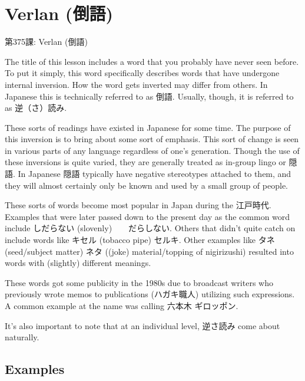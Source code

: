     
\chapter{Verlan (倒語)}

\begin{center}
\begin{Large}
第375課: Verlan (倒語) 
\end{Large}
\end{center}
 
\par{ The title of this lesson includes a word that you probably have never seen before. To put it simply, this word specifically describes words that have undergone internal inversion. How the word gets inverted may differ from others. In Japanese this is technically referred to as 倒語. Usually, though, it is referred to as 逆（さ）読み. }

\par{ These sorts of readings have existed in Japanese for some time. The purpose of this inversion is to bring about some sort of emphasis. This sort of change is seen in various parts of any language regardless of one's generation. Though the use of these inversions is quite varied, they are generally treated as in-group lingo or 隠語. In Japanese 隠語 typically have negative stereotypes attached to them, and they will almost certainly only be known and used by a small group of people. }

\par{ These sorts of words become most popular in Japan during the 江戸時代. Examples that were later passed down to the present day as the common word include しだらない (slovenly)　\textrightarrow 　だらしない. Others that didn't quite catch on include words like キセル (tobacco pipe) \textrightarrow  セルキ. Other examples like タネ (seed\slash subject matter) \textrightarrow  ネタ ((joke) material\slash topping of nigirizushi) resulted into words with (slightly) different meanings. }

\par{ These words got some publicity in the 1980s due to broadcast writers who previously wrote memos to publications (ハガキ職人) utilizing such expressions. A common example at the name was calling 六本木 ギロッポン. }

\par{ It's also important to note that at an individual level, 逆さ読み come about naturally. }
      
\section{Examples}
 
